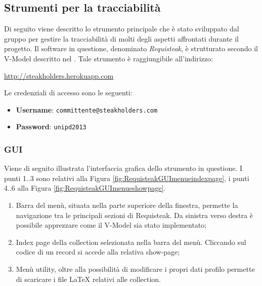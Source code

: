 	\subsection{Strumenti per la tracciabilità}
	\label{requisteak}
	Di seguito viene descritto lo strumento principale che è stato sviluppato dal gruppo per gestire la tracciabilità di molti degli aspetti affrontati durante il progetto. Il software in questione, denominato \emph{Requisteak}, è strutturato secondo il V-Model descritto nel \PianoDiQualifica{}.
	Tale strumento è raggiungibile all'indirizzo:
     \begin{center}
         \url{http://steakholders.herokuapp.com}
     \end{center} 
     Le credenziali di accesso sono le seguenti:
     \begin{itemize}
        \item \textbf{Username}: \texttt{committente@steakholders.com}
        \item \textbf{Password}: \texttt{unipd2013}
     \end{itemize}

     \newpage
     \subsubsection{GUI}
     Viene di seguito illustrata l'interfaccia grafica dello strumento in questione. I punti 1..3 sono relativi alla Figura \ref{fig:RequisteakGUImenueindexpage}, i punti 4..6 alla Figura \ref{fig:RequisteakGUImenueshowpage}.

     \begin{enumerate}
	 	\item Barra del menù, situata nella parte superiore della finestra, permette la navigazione tra le principali sezioni di Requisteak. Da sinistra verso destra è possibile apprezzare come il V-Model sia stato implementato;
	 	\item Index page della collection selezionata nella barra del menù. Cliccando sul codice di un record si accede alla relativa show-page;
	 	\item Menù utility, oltre alla possibilità di modificare i propri dati profilo permette di scaricare i file \LaTeX{} relativi alle collection.
	 \end{enumerate}

